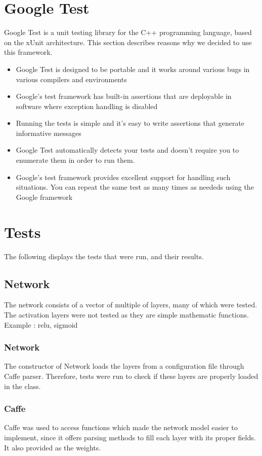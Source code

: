 \documentclass[parskip=full]{scrartcl}
\begin{document}
\section {Google Test}
Google Test is a unit testing library for the C++ programming language, based on the xUnit architecture. This section describes reasons why we decided to use this framework.
\begin{itemize}
	\item  Google Test is designed to be portable and it works around various bugs in various compilers and environments
	\item  Google's test framework has built-in assertions that are deployable in software where exception handling is disabled
	\item  Running the tests is simple and it’s easy to write assertions that generate informative messages
	\item  Google Test automatically detects your tests and doesn’t require you to enumerate them in order to run them.
	\item  Google's test framework provides excellent support for handling such situations. You can repeat the same test as many times as neededs using the Google framework

\end{itemize}
\pagebreak
\section {Tests}
The following displays the tests that were run, and their results.
\pagebreak
\subsection{Network}
The network consists of a vector of multiple of layers, many of which were tested. The activation layers were not tested as they are simple mathematic functions. Example : relu, sigmoid
\subsubsection{Network}
The constructor of Network loads the layers from a configuration file through Caffe parser. Therefore, tests were run to check if these layers are properly loaded in the class.
\subsubsection{Caffe}
Caffe was used to access functions which made the network model easier to implement, since it offers parsing methods to fill each layer with its proper fields. It also provided as the weights.
\end{document}
